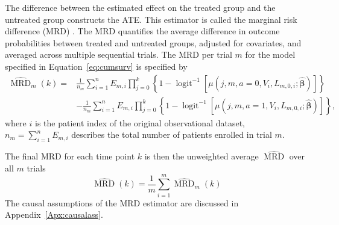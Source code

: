 \documentclass[pdflatex,sn-vancouver-ay]{sn-jnl}%
\theoremstyle{thmstyleone}%
\theoremstyle{thmstyletwo}%
\theoremstyle{thmstylethree}%
\begin{document}
The difference between the estimated effect on the treated group and the untreated group constructs the ATE. This estimator is called the marginal risk difference (MRD) \citep{keoghCausalInferenceSurvival2023, hernanHazardsHazardRatios2010}. The MRD quantifies the average difference in outcome probabilities between treated and untreated groups, adjusted for covariates, and averaged across multiple sequential trials. The MRD per trial $m$ for the model specified in Equation~\ref{eq:cumsurv} is specified by
\begin{equation}
    \begin{aligned}
    \label{eq:MRD}
    \widehat{\operatorname{MRD}}_m(k)= & \frac{1}{n_m} \sum_{i=1}^n E_{m, i} \prod_{j=0}^k\left\{1-\operatorname{logit}^{-1}\left[\mu\left(j, m, a=0, V_i, L_{m, 0, i} ; \hat{\boldsymbol{\beta}}\right)\right]\right\} \\
    & -\frac{1}{n_m} \sum_{i=1}^n E_{m, i} \prod_{j=0}^k\left\{1-\operatorname{logit}^{-1}\left[\mu\left(j, m, a=1, V_i, L_{m, 0, i} ; \hat{\boldsymbol{\beta}}\right)\right]\right\},
    \end{aligned}
\end{equation}
where $i$ is the patient index of the original observational dataset, $n_m=\sum_{i=1}^n E_{m, i}$ describes the total number of patients enrolled in trial $m$.

The final MRD for each time point $k$ is then the unweighted average $\widehat{\operatorname{MRD}}$ over all $m$ trials
\begin{equation}
    \label{eq:MRD_mean}
    \widehat{\operatorname{MRD}}(k) = \frac{1}{m} \sum_{i=1}^{m} \widehat{\operatorname{MRD}}_m(k)
\end{equation}
The causal assumptions of the MRD estimator are discussed in Appendix~\ref{Apx:causalass}.
\end{document}
